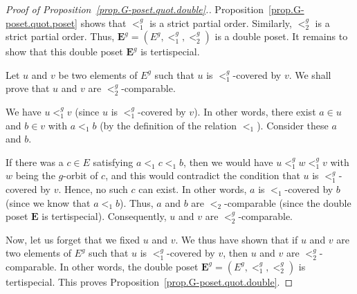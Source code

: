 \documentclass[12pt]{article}
\theoremstyle{plain}
\theoremstyle{definition}
\theoremstyle{remark}
\newcommand{\EE}{{\mathbf{E}}}
\begin{document}
\begin{proof}[Proof of Proposition~\ref{prop.G-poset.quot.double}.]

Proposition~\ref{prop.G-poset.quot.poset} shows that $<_{1}^{g}$ is a
strict partial order. Similarly, $<_{2}^{g}$ is a
strict partial order.
Thus, $\EE^g
= \left(E^g, <_1^g, <_2^g\right)$ is a double poset. It remains
to show that this double poset $\EE^g$ is tertispecial.

Let $u$ and $v$ be two elements of
$E^{g}$ such that $u$ is $<_{1}^{g}$-covered by $v$. We shall prove that $u$
and $v$ are $<_{2}^{g}$-comparable.

We have $u<_{1}^{g}v$ (since $u$ is $<_{1}^{g}$-covered by $v$). In other
words, there exist $a\in u$ and $b\in v$ with $a<_{1}b$ (by the
definition of the relation $<_1$). Consider these $a$ and $b$.


If there was a $c \in E$ satisfying $a <_1 c <_1 b$, then we
would have $u <_1^g w <_1^g v$ with $w$ being the $g$-orbit of
$c$, and this would contradict the condition that $u$ is
$<_1^g$-covered by $v$. Hence, no such $c$ can exist.
In other words, $a$ is $<_1$-covered by $b$ (since we know that
$a <_1 b$). Thus, $a$ and $b$ are $<_2$-comparable (since the
double poset $\EE$ is tertispecial).
Consequently, $u$ and $v$ are $<_2^g$-comparable.


Now, let us forget that we fixed $u$ and $v$. We thus have shown that if
$u$ and $v$ are two elements of $E^{g}$ such that $u$ is $<_{1}^{g}$-covered
by $v$, then $u$ and $v$ are $<_{2}^{g}$-comparable. In other words, the
double poset $\EE^g = \left(E^g, <_1^g, <_2^g\right)$ is tertispecial. This
proves Proposition~\ref{prop.G-poset.quot.double}.
\end{proof}
\end{document}
